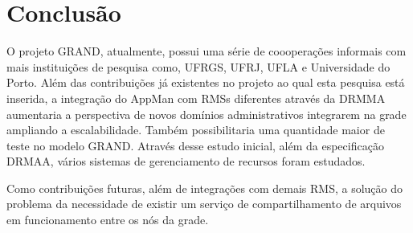 \section{Conclusão}
\label{cap:conclusao}

O projeto GRAND, atualmente, possui uma série de coooperações informais com mais instituições de pesquisa como, UFRGS, UFRJ, UFLA e Universidade do Porto. Além das contribuições já existentes no projeto ao qual esta pesquisa está inserida, a integração do AppMan com RMSs diferentes através da DRMMA aumentaria a perspectiva de novos domínios administrativos integrarem na grade ampliando a escalabilidade. Também possibilitaria uma quantidade maior de teste no modelo GRAND. Através desse estudo inicial, além da especificação DRMAA, vários sistemas de gerenciamento de recursos foram estudados.

Como contribuições futuras, além de integrações com demais RMS, a solução do problema da necessidade de existir um serviço de compartilhamento de arquivos em funcionamento entre os nós da grade.
